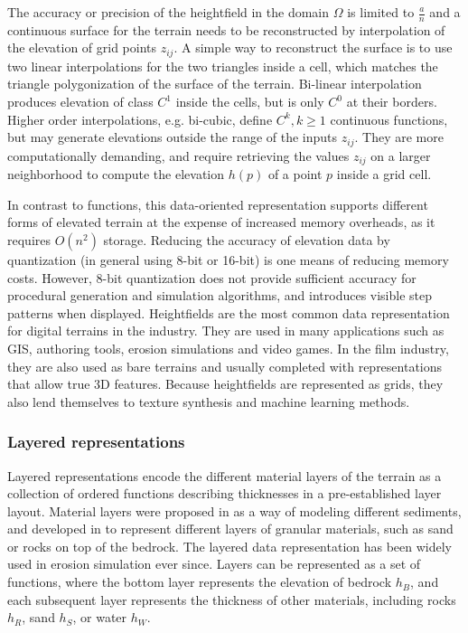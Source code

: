 \documentclass{article}
\begin{document}
The accuracy or precision of the heightfield in the domain $\Omega$ is limited to $\frac{a}{n}$ and a continuous surface for the terrain needs to be reconstructed by interpolation of the elevation of grid points $z_{ij}$. A simple way to reconstruct the surface is to use two linear interpolations for the two triangles inside a cell, which matches the triangle polygonization of the surface of the terrain. Bi-linear interpolation produces elevation of class $C^1$ inside the cells, but is only $C^0$ at their borders. Higher order interpolations, e.g. bi-cubic, define $C^k, k \geq 1$ continuous functions, but may generate elevations outside the range of the inputs $z_{ij}$. They are more computationally demanding, and require retrieving the values $z_{ij}$ on a larger neighborhood to compute the elevation $h(p)$ of a point $p$ inside a grid cell.

In contrast to functions, this data-oriented representation supports different forms of elevated terrain at the expense of increased memory overheads, as it requires $O(n^2)$ storage. Reducing the accuracy of elevation data by quantization (in general using 8-bit or 16-bit) is one means of reducing memory costs. However, 8-bit quantization does not provide sufficient accuracy for procedural generation and simulation algorithms, and introduces visible step patterns when displayed. Heightfields are the most common data representation for digital terrains in the industry. They are used in many applications such as GIS, authoring tools, erosion simulations and video games. In the film industry, they are also used as bare terrains and usually completed with representations that allow true 3D features. Because heightfields are represented as grids, they also lend themselves to texture synthesis and machine learning methods.

\subsubsection{Layered representations}

Layered representations encode the different material layers of the terrain as a collection of ordered functions describing thicknesses in a pre-established layer layout. Material layers were proposed in \cite{MKM89} as a way of modeling different sediments, and developed in \cite{BF01, CGG17} to represent different layers of granular materials, such as sand or rocks on top of the bedrock. The layered data representation has been widely used in erosion simulation ever since. Layers can be represented as a set of functions, where the bottom layer represents the elevation of bedrock $h_B$, and each subsequent layer represents the thickness of other materials, including rocks $h_R$, sand $h_S$, or water $h_W$.
\end{document}
